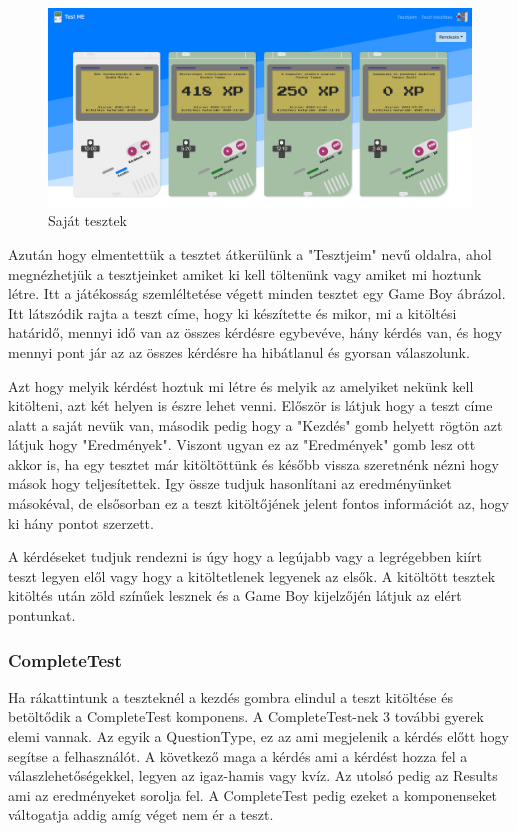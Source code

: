 \begin{figure}[H]
    \centering
    \includegraphics[width=\linewidth]{images/my_tests.png}
    \caption{Saját tesztek}
\end{figure}

Azután hogy elmentettük a tesztet átkerülünk a "Tesztjeim" nevű oldalra, ahol megnézhetjük a tesztjeinket amiket ki kell töltenünk vagy amiket mi hoztunk létre. Itt a játékosság szemléltetése végett minden tesztet egy Game Boy ábrázol. Itt látszódik rajta a teszt címe, hogy ki készítette és mikor, mi a kitöltési határidő, mennyi idő van az összes kérdésre egybevéve, hány kérdés van, és hogy mennyi pont jár az az összes kérdésre ha hibátlanul és gyorsan válaszolunk.

Azt hogy melyik kérdést hoztuk mi létre és melyik az amelyiket nekünk kell kitölteni, azt két helyen is észre lehet venni. Először is látjuk hogy a teszt címe alatt a saját nevük van, második pedig hogy a "Kezdés" gomb helyett rögtön azt látjuk hogy "Eredmények". Viszont ugyan ez az "Eredmények" gomb lesz ott akkor is, ha egy tesztet már kitöltöttünk és később vissza szeretnénk nézni hogy mások hogy teljesítettek. Igy össze tudjuk hasonlítani az eredményünket másokéval, de elsősorban ez a teszt kitöltőjének jelent fontos információt az, hogy ki hány pontot szerzett.

A kérdéseket tudjuk rendezni is úgy hogy a legújabb vagy a legrégebben kiírt teszt legyen elől vagy hogy a kitöltetlenek legyenek az elsők.
A kitöltött tesztek kitöltés után zöld színűek lesznek és a Game Boy kijelzőjén látjuk az elért pontunkat.


\subsubsection{CompleteTest}

Ha rákattintunk a teszteknél a kezdés gombra elindul a teszt kitöltése és betöltődik a CompleteTest komponens. A CompleteTest-nek 3 további gyerek elemi vannak. Az egyik a QuestionType, ez az ami megjelenik a kérdés előtt hogy segítse a felhasználót. A következő maga a kérdés ami a kérdést hozza fel a válaszlehetőségekkel, legyen az igaz-hamis vagy kvíz. Az utolsó pedig az Results ami az eredményeket sorolja fel. A CompleteTest pedig ezeket a komponenseket váltogatja addig amíg véget nem ér a teszt.

